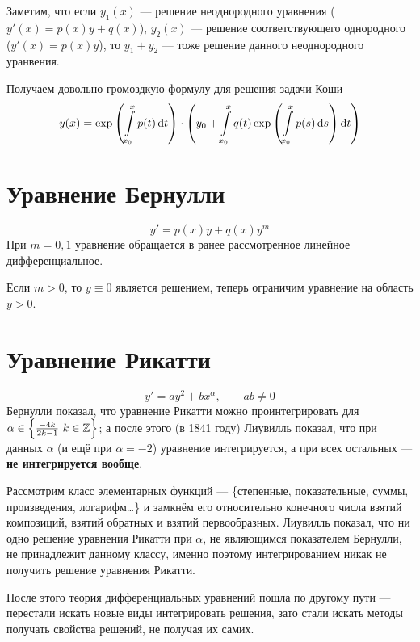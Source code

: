 \documentclass[a4paper]{report}
\begin{document}
{        \item Заметим, что если $y_1(x)$ --- решение неоднородного уравнения ($y'(x) = p(x)y + q(x)$), $y_2(x)$ --- решение соответствующего однородного ($y'(x) = p(x)y$), то $y_1 + y_2$ --- тоже решение данного неоднородного уранвения.

        Получаем довольно громоздкую формулу для решения задачи Коши
        \[y(x) = \exp\left(\int\limits_{x_0}^{x}p(t)\operatorname{d}\! t\right)\cdot \left(y_0 + \int\limits_{x_0}^{x}q(t)\exp\left(\int\limits_{x_0}^{x}p(s)\operatorname{d}\! s\right)\operatorname{d}\! t\right)\]
    }


    \section{Уравнение Бернулли}
    \[y' = p(x)y + q(x)y^m\]
    При $m = 0, 1$ уравнение обращается в ранее рассмотренное линейное дифференциальное.

    Если $m > 0$, то $y \equiv 0$ является решением, теперь ограничим уравнение на область $y > 0$.


    \section{Уравнение Рикатти}
    \[y' = ay^2 + bx^{\alpha}, \qquad ab \ne 0\]
    Бернулли показал, что уравнение Рикатти можно проинтегрировать для $\alpha \in \left\{\frac{-4 k}{2k - 1}\middle|k \in \mathbb{Z}\right\}$;
    а после этого (в 1841 году) Лиувилль показал, что при данных $\alpha$ (и ещё при $\alpha = -2$) уравнение интегрируется, а при всех остальных --- \textbf{не интегрируется вообще}.

    Рассмотрим класс элементарных функций --- \{степенные, показательные, суммы, произведения, логарифм\ldots\} и замкнём его относительно конечного числа взятий композиций, взятий обратных и взятий первообразных.
    Лиувилль показал, что ни одно решение уравнения Рикатти при $\alpha$, не являющимся показателем Бернулли, не принадлежит данному классу, именно поэтому интегрированием никак не получить решение уравнения Рикатти.

    После этого теория дифференциальных уравнений пошла по другому пути --- перестали искать новые виды интегрировать решения, зато стали искать методы получать свойства решений, не получая их самих.
\end{document}
